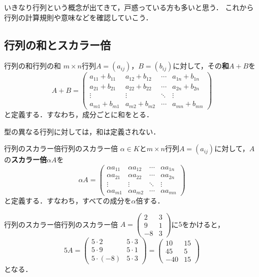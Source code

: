 いきなり行列という概念が出てきて，戸惑っている方も多いと思う．
これから行列の計算規則や意味などを確認していこう．

\subsection{行列の和とスカラー倍}

\begin{definition}{行列の和}{行列の和}
  $m \times n$行列$A = (a_{ij})$，$B = (b_{ij})$に対して，その\textbf{和}$A + B$を
  \[
    A + B =
    \begin{pmatrix}
      a_{11} + b_{11} & a_{12} + b_{12} & \cdots & a_{1n} + b_{1n} \\
      a_{21} + b_{21} & a_{22} + b_{22} & \cdots & a_{2n} + b_{2n} \\
      \vdots & \vdots & \ddots & \vdots \\
      a_{m1} + b_{m1} & a_{m2} + b_{m2} & \cdots & a_{mn} + b_{mn}
    \end{pmatrix}
  \]
  と定義する．すなわち，成分ごとに和をとる．
\end{definition}

型の異なる行列に対しては，和は定義されない．

\begin{definition}{行列のスカラー倍}{行列のスカラー倍}
  $\alpha \in K$と$m \times n$行列$A = (a_{ij})$に対して，$A$の\textbf{スカラー倍}$\alpha A$を
  \[
    \alpha A =
    \begin{pmatrix}
      \alpha a_{11} & \alpha a_{12} & \cdots & \alpha a_{1n} \\
      \alpha a_{21} & \alpha a_{22} & \cdots & \alpha a_{2n} \\
      \vdots & \vdots & \ddots & \vdots \\
      \alpha a_{m1} & \alpha a_{m2} & \cdots & \alpha a_{mn}
    \end{pmatrix}
  \]
  と定義する．すなわち，すべての成分を$\alpha$倍する．
\end{definition}

\begin{example}{行列のスカラー倍}{行列のスカラー倍}
  $A = \begin{pmatrix} 2 & 3 \\ 9 & 1 \\ -8 & 3 \end{pmatrix}$に$5$をかけると，
  \[
    5A =
    \begin{pmatrix}
      5 \cdot 2 & 5 \cdot 3 \\
      5 \cdot 9 & 5 \cdot 1 \\
      5 \cdot (-8) & 5 \cdot 3
    \end{pmatrix}
    =
    \begin{pmatrix}
      10 & 15 \\
      45 & 5 \\
      -40 & 15
    \end{pmatrix}
  \]
  となる．
\end{example}


